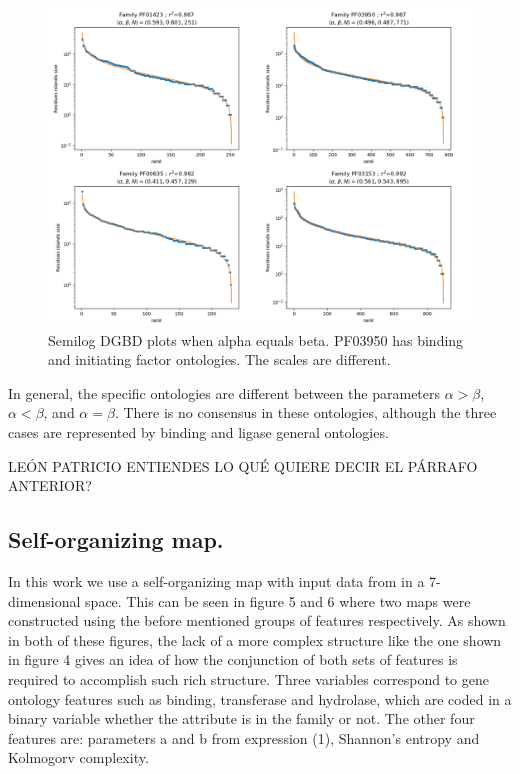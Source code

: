 \documentclass[preprint,12pt]{elsarticle}
\begin{document}
\begin{figure} %
    \centering
    \includegraphics[width=13cm]{images/03_mejoresLaVallete.png}
    \bigbreak
    \caption {Semilog DGBD plots when alpha equals beta. PF03950 has binding 
    and initiating factor ontologies. The scales are different.}
    \label{fig:alphabeta}
\end{figure}
\clearpage


In general, the specific ontologies are different between the 
parameters $\alpha > \beta$, $\alpha < \beta $, and $\alpha = \beta $. 
There is no consensus in these ontologies, although the three cases are 
represented by binding and ligase general ontologies. \par 

LEÓN PATRICIO ENTIENDES LO QUÉ QUIERE DECIR EL PÁRRAFO ANTERIOR? \par


\subsection{\textbf{Self-organizing map.}}

In this work we use a self-organizing map with input data 
from in a 7-dimensional space. This can be seen in figure 5 and 6 
where two maps were constructed using the before mentioned groups of 
features respectively.  As shown in both of these figures, the lack 
of a more complex structure like the one shown in figure 4 gives 
an idea of how the conjunction of both sets of features is required 
to accomplish such rich structure. Three variables correspond to gene 
ontology features such as binding, transferase and hydrolase, which 
are coded in a binary variable whether the attribute is in the family 
or not. The other four features are: parameters a and b from expression 
(1),  Shannon’s entropy and Kolmogorv complexity. \par 
\end{document}
